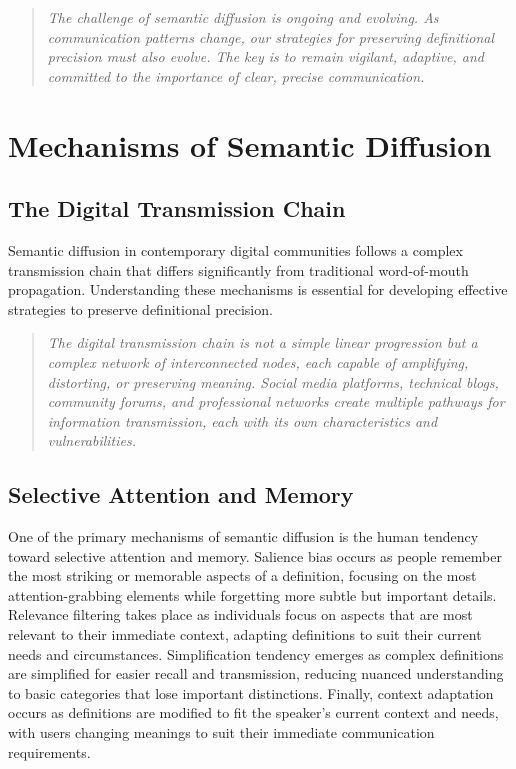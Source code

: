 \documentclass[11pt]{article}
\begin{document}
\begin{quote}
\emph{The challenge of semantic diffusion is ongoing and evolving. As communication patterns change, our strategies for preserving definitional precision must also evolve. The key is to remain vigilant, adaptive, and committed to the importance of clear, precise communication.}
\end{quote}

\section{Mechanisms of Semantic Diffusion}

\subsection{The Digital Transmission Chain}

Semantic diffusion in contemporary digital communities follows a complex transmission chain that differs significantly from traditional word-of-mouth propagation. Understanding these mechanisms is essential for developing effective strategies to preserve definitional precision.

\begin{quote}
\emph{The digital transmission chain is not a simple linear progression but a complex network of interconnected nodes, each capable of amplifying, distorting, or preserving meaning. Social media platforms, technical blogs, community forums, and professional networks create multiple pathways for information transmission, each with its own characteristics and vulnerabilities.}
\end{quote}

\subsection{Selective Attention and Memory}

One of the primary mechanisms of semantic diffusion is the human tendency toward selective attention and memory. Salience bias occurs as people remember the most striking or memorable aspects of a definition, focusing on the most attention-grabbing elements while forgetting more subtle but important details. Relevance filtering takes place as individuals focus on aspects that are most relevant to their immediate context, adapting definitions to suit their current needs and circumstances. Simplification tendency emerges as complex definitions are simplified for easier recall and transmission, reducing nuanced understanding to basic categories that lose important distinctions. Finally, context adaptation occurs as definitions are modified to fit the speaker's current context and needs, with users changing meanings to suit their immediate communication requirements.
\end{document}
